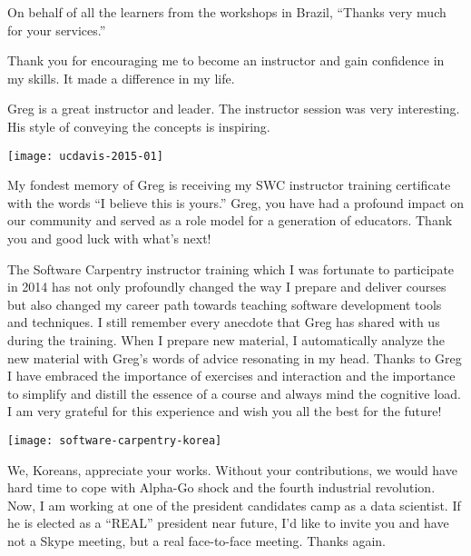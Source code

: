On behalf of all the learners from the workshops in Brazil, ``Thanks very much
for your services.''



Thank you for encouraging me to become an instructor and gain confidence in my
skills. It made a difference in my life.



Greg is a great instructor and leader. The instructor session was very
interesting. His style of conveying the concepts is inspiring.


\newpage
\vspace*{\fill}

\texttt{[image: ucdavis-2015-01]}

My fondest memory of Greg is receiving my SWC instructor training certificate
with the words ``I believe this is yours.'' Greg, you have had a profound
impact on our community and served as a role model for a generation of
educators.  Thank you and good luck with what's next!



The Software Carpentry instructor training which I was fortunate to participate
in 2014 has not only profoundly changed the way I prepare and deliver courses
but also changed my career path towards teaching software development tools and
techniques. I still remember every anecdote that Greg has shared with us during
the training. When I prepare new material, I automatically analyze the new
material with Greg's words of advice resonating in my head. Thanks to Greg I
have embraced the importance of exercises and interaction and the importance to
simplify and distill the essence of a course and always mind the cognitive
load. I am very grateful for this experience and wish you all the best for the
future!

\vspace*{\fill}

\newpage
\vspace*{0.6in}
\texttt{[image: software-carpentry-korea]}

We, Koreans, appreciate your works. Without your contributions, we would have
hard time to cope with Alpha-Go shock and the fourth industrial revolution.
Now, I am working at one of the president candidates camp as a data scientist.
If he is elected as a ``REAL'' president near future, I'd like to invite you
and have not a Skype meeting, but a real face-to-face meeting. Thanks again. 

